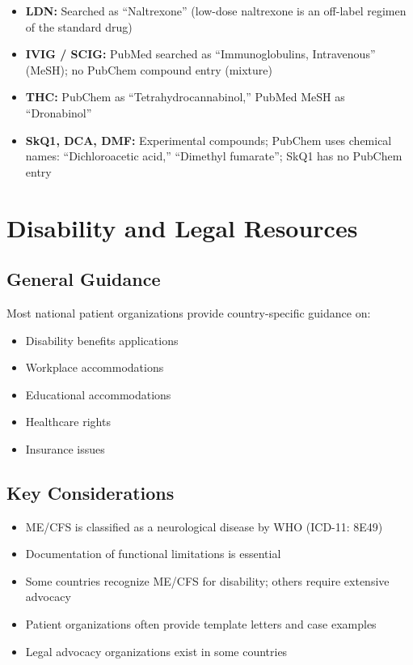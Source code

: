 \begin{itemize}
\item \textbf{LDN:} Searched as ``Naltrexone'' (low-dose naltrexone is an off-label regimen of the standard drug)
\item \textbf{IVIG / SCIG:} PubMed searched as ``Immunoglobulins, Intravenous'' (MeSH); no PubChem compound entry (mixture)
\item \textbf{THC:} PubChem as ``Tetrahydrocannabinol,'' PubMed MeSH as ``Dronabinol''
\item \textbf{SkQ1, DCA, DMF:} Experimental compounds; PubChem uses chemical names: ``Dichloroacetic acid,'' ``Dimethyl fumarate''; SkQ1 has no PubChem entry
\end{itemize}

\section{Disability and Legal Resources}
\label{sec:disability-resources}

\subsection{General Guidance}

Most national patient organizations provide country-specific guidance on:
\begin{itemize}
    \item Disability benefits applications
    \item Workplace accommodations
    \item Educational accommodations
    \item Healthcare rights
    \item Insurance issues
\end{itemize}

\subsection{Key Considerations}

\begin{itemize}
    \item ME/CFS is classified as a neurological disease by WHO (ICD-11: 8E49)
    \item Documentation of functional limitations is essential
    \item Some countries recognize ME/CFS for disability; others require extensive advocacy
    \item Patient organizations often provide template letters and case examples
    \item Legal advocacy organizations exist in some countries
\end{itemize}

